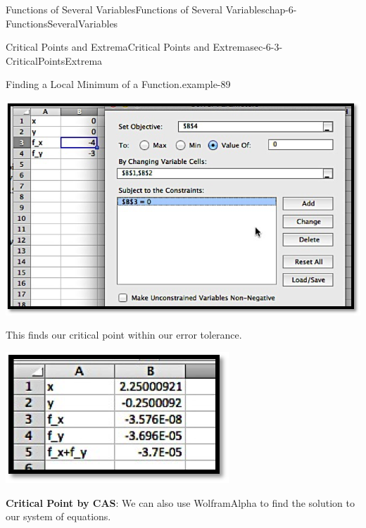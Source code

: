 \documentclass[oneside,10pt,]{book}
\newcommand{\terminology}[1]{\textbf{#1}}
\numberwithin{equation}{section}
\begin{document}
\begin{chapterptx}{Functions of Several Variables}{}{Functions of Several Variables}{}{}{chap-6-FunctionsSeveralVariables}
\begin{sectionptx}{Critical Points and Extrema}{}{Critical Points and Extrema}{}{}{sec-6-3-CriticalPointsExtrema}
\begin{example}{Finding a Local Minimum of a Function.}{example-89}
\begin{sidebyside}{1}{0.1}{0.1}{0}
\begin{sbspanel}{0.8}
\includegraphics[width=1\linewidth]{images/sec-6-3-2.png}
\end{sbspanel}%
\end{sidebyside}%
\par
\hypertarget{p-2339}{}%
This finds our critical point within our error tolerance.%
\begin{sidebyside}{1}{0.3}{0.3}{0}%
\begin{sbspanel}{0.4}%
\includegraphics[width=1\linewidth]{images/sec-6-3-3.png}
\end{sbspanel}%
\end{sidebyside}%
\par
\hypertarget{p-2340}{}%
\terminology{Critical Point by CAS}: We can also use Wolfram\textbar{}Alpha to find the solution to our system of equations.%
\begin{sidebyside}{1}{0.1}{0.1}{0}%
\begin{sbspanel}{0.8}%

\end{sbspanel}
\end{sidebyside}
\end{example}
\end{sectionptx}
\end{chapterptx}
\end{document}
